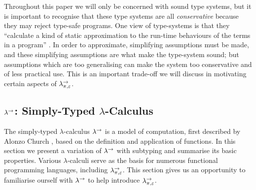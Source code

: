 Throughout this paper we will only be concerned with sound type systems, but it is important to recognise that these type systems are all \textit{conservative} because they may reject type-safe programs. One view of type-systems is that they ``calculate a kind of static  approximation to the run-time behaviours of the terms in a program'' \cite[p. 2]{tapl}. In order to approximate, simplifying assumptions must be made, and these simplifying assumptions are what make the type-system sound; but assumptions which are too generalising can make the system too conservative and of less practical use. This is an important trade-off we will discuss in motivating certain aspects of $\lambda^{\rightarrow}_{\pi, \varepsilon}$.



\subsection{ $\lambda^{\rightarrow}$: Simply-Typed $\lambda$-Calculus}

The simply-typed $\lambda$-calculus $\lambda^{\rightarrow}$ is a model of computation, first described by Alonzo Church \cite{church40}, based on the definition and application of functions. In this section we present a variation of $\lambda^{\rightarrow}$ with subtyping and summarise its basic properties. Various $\lambda$-calculi serve as the basis for numerous functional programming languages, including $\lambda^{\rightarrow}_{\pi, \varepsilon}$. This section gives us an opportunity to familiarise ourself with $\lambda^{\rightarrow}$ to help introduce $\lambda^{\rightarrow}_{\pi, \varepsilon}$.

